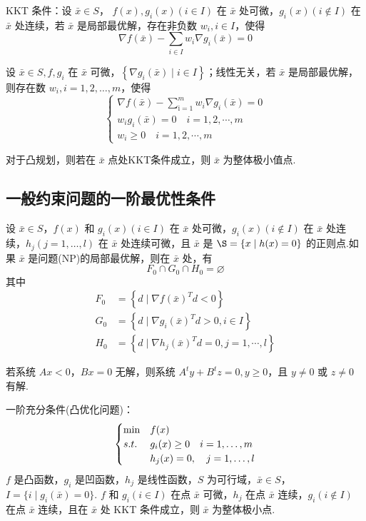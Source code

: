 \begin{theorem}
    KKT 条件：设 $\bar{x} \in S$， $f(x), g_i(x)(i \in I)$ 在 $\bar{x}$ 处可微，$g_i(x)(i\notin I)$ 在 $\bar{x}$ 处连续，若 $\bar{x}$ 是局部最优解，存在非负数 $w_i, i \in I$，使得\[\nabla f(\bar{x}) - \sum_{i \in I}w_i\nabla g_i(\bar{x}) = 0\]
    
    设 $\bar{x} \in S, f, g_i$ 在 $\bar{x}$ 可微，$\left\{\nabla g_i(\bar{x}) \mid i \in I\right\}$；线性无关，若 $\bar{x}$ 是局部最优解，则存在数 $w_i, i=1, 2, \dots, m$，使得
    \[
        \begin{cases}
            \nabla f(\bar{x})-\sum_{\mathrm{i}=1}^{m} w_{i} \nabla g_{i}(\bar{x})=0 \\
            w_{i} g_{i}(\bar{x})=0 \quad i=1,2, \cdots, m \\
            w_{i} \geq 0 \quad i=1,2, \cdots, m 
        \end{cases}
    \]

    对于凸规划，则若在 $\bar{x}$ 点处KKT条件成立，则 $\bar{x}$ 为整体极小值点.
\end{theorem}

\subsection{一般约束问题的一阶最优性条件}
\begin{theorem}
    设 $\bar{x} \in S$，$f(x)$ 和 $g_i(x)(i\in I)$ 在 $\bar{x}$ 处可微，$g_i(x) (i \notin I)$ 在 $\bar{x}$ 处连续，$h_j(j = 1, \dots, l)$ 在 $\bar{x}$ 处连续可微，且 $\bar{x}$ 是 $\S = \{x \mid h(x) = 0\}$ 的正则点.如果 $\bar{x}$ 是问题(NP)的局部最优解，则在 $\bar{x}$ 处，有\[F_{0} \cap G_{0} \cap H_{0}=\varnothing\]其中
    \begin{align*}
        F_{0}&=\left\{d \mid \nabla f(\bar{x})^{T} d<0\right\} \\
        G_{0}&=\left\{d \mid \nabla g_{i}(\bar{x})^{T} d>0, i \in I\right\} \\
        H_{0}&=\left\{d \mid \nabla h_{j}(\bar{x})^{T} d=0, j=1, \cdots, l\right\}
    \end{align*}
\end{theorem}

\begin{theorem}
    若系统 $Ax < 0$，$Bx = 0$ 无解，则系统 $A^ty + B^tz = 0, y \ge 0$，且 $y \neq 0$ 或 $z \neq 0$ 有解.
\end{theorem}

\begin{note}
    一阶充分条件(凸优化问题)：\[\begin{cases}
        \min &f(x)\\
        s.t. &g_i(x) \ge 0 \quad i = 1, \dots, m\\
        &h_j(x) = 0, \quad j = 1, \dots, l
    \end{cases}\]
    $f$ 是凸函数，$g_i$ 是凹函数，$h_j$ 是线性函数，$S$ 为可行域，$\bar{x} \in S$，$I = \{i \mid g_i(\bar{x}) = 0\}$. $f$ 和 $g_i(i \in I)$ 在点 $\bar{x}$ 可微，$h_j$ 在点 $\bar{x}$ 连续，$g_i(i \notin I)$ 在点 $\bar{x}$ 连续，且在 $\bar{x}$ 处 KKT 条件成立，则 $\bar{x}$ 为整体极小点.
\end{note}

